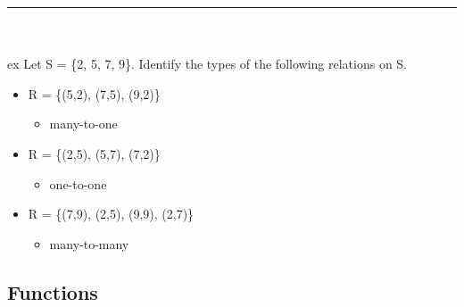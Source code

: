 \documentclass[12pt, letterpaper]{article}
\newcommand{\exheader}[1][ex]{{\tiny{#1}\normalsize}}
\newcommand{\horizline}[0]{\noindent\rule{\textwidth}{1pt}\\}
\begin{document}
\horizline\\
\exheader[ex] Let S =  \{2, 5, 7, 9\}. Identify the types of the following relations on S.
\begin{itemize}[label={}, leftmargin=*]
	\item R = \{(5,2), (7,5), (9,2)\}
	\begin{itemize}
		\item many-to-one
	\end{itemize}
	\item R = \{(2,5), (5,7), (7,2)\}
	\begin{itemize}
		\item one-to-one
	\end{itemize}
	\item R = \{(7,9), (2,5), (9,9), (2,7)\}
	\begin{itemize}
		\item many-to-many
	\end{itemize}
\end{itemize}


\pagebreak

\subsection{Functions}
\end{document}
